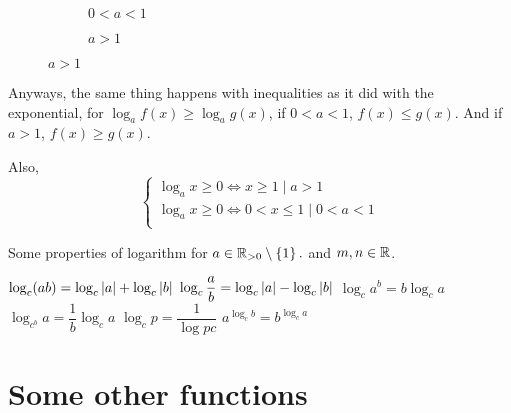 \begin{figure}
    [H]
    \centering 
    \begin{subfigure}{0.5\textwidth}
        \caption{\(0 < a < 1\)}
    \end{subfigure}%
    \begin{subfigure}{0.5\textwidth}
        \caption{\(a > 1\)}
    \end{subfigure}
\end{figure}

Anyways, the same thing happens with inequalities as it did with the exponential,
for \(\log_{a}f(x) \ge \log_{a} g(x)\), if \(0 < a < 1\), \(f(x) \le g(x)\). And if
\(a > 1\), \(f(x) \ge g(x)\). 

Also, 
\[
    \begin{cases}
        \log_{a} x \ge 0 \iff x \ge 1 \mid a > 1 \\
        \log_{a} x \ge 0 \iff 0< x \le 1 \mid 0 < a < 1 \\
    \end{cases}
\]

\begin{proposition}
    Some properties of logarithm for \(a \in \mathbb R_{>0} \setminus \left\{1\right\}. \) and
    \(m, n \in \mathbb R\).  
    \begin{enumerate}
        \ii \(\log_{c}(ab) = \log_{c}\abs{a} + \log_{c}\abs{b}\)
        \ii \(\log_{c}\dfrac{a}{b} = \log_{c}\abs{a} - \log_{c}\abs{b}\)
        \ii \(\log_{c}{a^b} = b\log_{c}{a}\)
        \ii \(\log_{c^b}{a} = \dfrac{1}{b}\log_{c}{a}\)
        \ii \(\log_{c}p = \dfrac{1}{\log{p}c}\)
        \ii \(a^{\log_{c}b} = b^{\log_{c}a}\)
    \end{enumerate}
\end{proposition}

\section{Some other functions}

